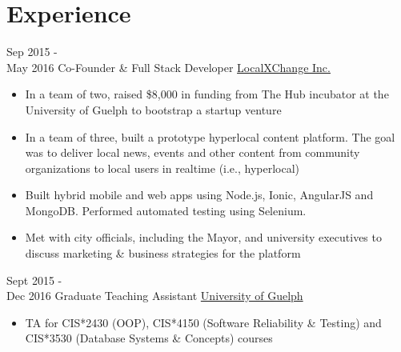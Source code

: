 \documentclass[letterpaper]{twentysecondcv} %
\begin{document}
\section{Experience}

\begin{twenty} %
	\twentyitem
    	{Sep 2015 - \\May 2016}
        {Co-Founder \& Full Stack Developer}
        {\href{http://www.localxchange.ca/}{LocalXChange Inc.}}
        {}
        {
        {\begin{itemize}
        \item In a team of two, raised \$8,000 in funding from The Hub incubator at the University of Guelph to bootstrap a startup venture
        \item In a team of three, built a prototype hyperlocal content platform. The goal was to deliver local news, events and other content from community organizations to local users in realtime (i.e., hyperlocal)
        \item Built hybrid mobile and web apps using Node.js, Ionic, AngularJS and MongoDB. Performed automated testing using Selenium.
        \item Met with city officials, including the Mayor, and university executives to discuss marketing \& business strategies for the platform 
    \end{itemize}}
        }
        
    \twentyitem
   		{Sept 2015 - \\ Dec 2016}
        {Graduate Teaching Assistant}
        {\href{http://www.uoguelph.ca}{University of Guelph}}
        {}
        {
        {\begin{itemize}
        \item TA for CIS*2430 (OOP), CIS*4150 (Software Reliability \& Testing) and CIS*3530 (Database Systems \& Concepts) courses
    \end{itemize}}
        }
        

\end{twenty}
\end{document}
